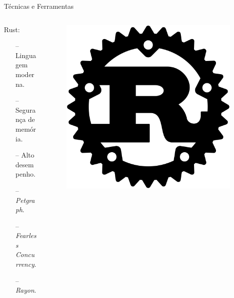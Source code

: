 \begin{frame}{Técnicas e Ferramentas}
    \begin{columns}
    \begin{column}{0.9\textwidth}
    Rust:
    \begin{itemize}
        \item[--] Linguagem moderna.
        \item[--] Segurança de memória.
        \item[--] Alto desempenho. 
        \item[--] \textit{Petgraph}.
        \item[--] \textit{Fearless Concurrency}.
        \item[--] \textit{Rayon}.
    \end{itemize}
    \end{column}

    \begin{column}{0.1\textwidth}
        \begin{figure}
            \includegraphics[width=\textwidth]{Figuras/Rust Logo.svg.png}
        \end{figure}
    \end{column}
    \end{columns}
\end{frame}

